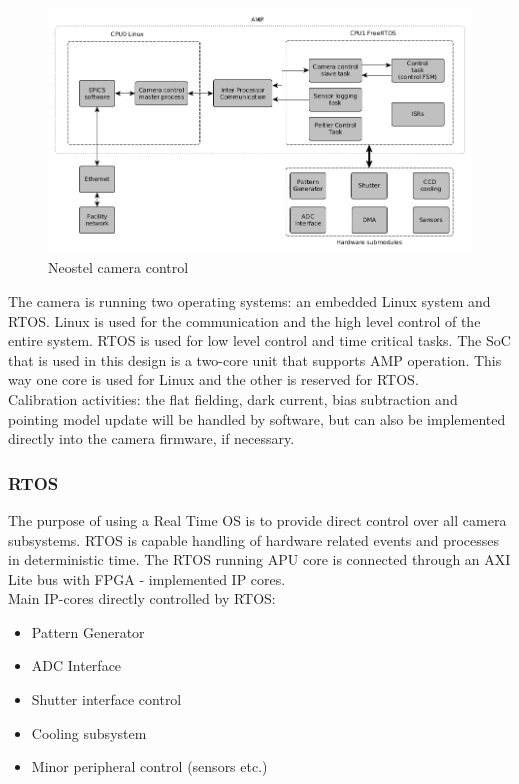 \begin{figure}[H]
\centering
\includegraphics[width=\textwidth]{pict_ipc/oses-control.png}
\caption{Neostel camera control}
\label{fig:oses_ctrl}
\end{figure}

The camera is running two operating systems: an embedded Linux system and RTOS. Linux is used for the communication and the high level control of the entire system. RTOS is used for low level control and time critical tasks. The SoC that is used in this design is a two-core unit that supports AMP operation. This way one core is used for Linux and the other is reserved for RTOS. \\
Calibration activities: the flat fielding, dark current, bias subtraction and pointing model update will be handled by software, but can also be implemented directly into the camera firmware, if necessary.

\subsubsection{RTOS}
The purpose of using a Real Time OS is to provide direct control over all camera subsystems. RTOS is capable handling of hardware related events and processes in deterministic time. The RTOS running APU core is connected through an AXI Lite bus with FPGA - implemented IP cores. \\
Main IP-cores directly controlled by RTOS:

\begin{itemize}
\item Pattern Generator
\item ADC Interface
\item Shutter interface control
\item Cooling subsystem
\item Minor peripheral control (sensors etc.)
\end{itemize}

